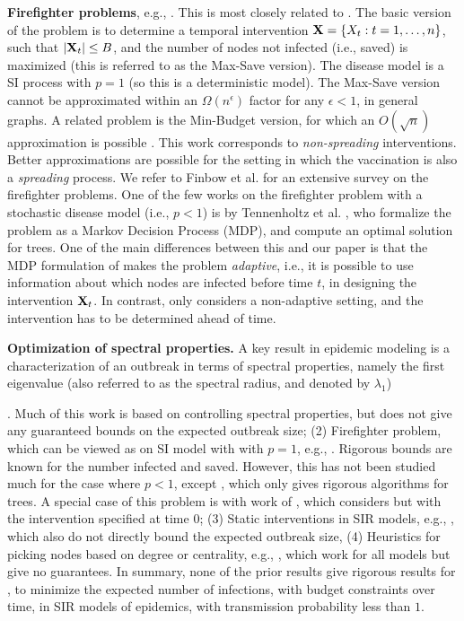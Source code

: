 \noindent
\textbf{Firefighter problems}, e.g., \cite{anshelevich09,Finbow2009TheFP,Chalermsook:2010:RMF:1873601.1873709}. 
This is most closely related to \prob{}. The basic version of the problem is to
determine a temporal intervention $\mathbf{X}=\{X_t: t=1,\ldots,n\}$, such that $|\mathbf{X}_t|\leq B$,
and the number of nodes not infected (i.e., saved) is maximized (this is referred to as the Max-Save version).
The disease model is a SI process with $p=1$ (so this is a deterministic model).
The Max-Save version cannot be approximated within an $\Omega(n^{\epsilon})$ factor for any $\epsilon < 1$, in general graphs.
A related problem is the Min-Budget version, for which an $O(\sqrt{n})$ approximation is 
possible \cite{Chalermsook:2010:RMF:1873601.1873709}.
This work corresponds to \emph{non-spreading} interventions. Better approximations are possible for the setting in which
the vaccination is also a \emph{spreading} process.
We refer to Finbow et al. \cite{Finbow2009TheFP} for an extensive survey on the firefighter problems.
One of the few works on the firefighter problem with a stochastic disease model (i.e., $p<1$) is by
Tennenholtz et al. \cite{DBLP:journals/corr/abs-1711-08237}, who formalize the problem as a Markov Decision Process (MDP),
and compute an optimal solution for trees.  One of the main differences between this and our paper is that
the MDP formulation of \cite{DBLP:journals/corr/abs-1711-08237} makes the problem \emph{adaptive},
i.e., it is possible to use information about which nodes are infected before time $t$, in designing 
the intervention $\mathbf{X}_t$. In contrast, \prob{} only considers a non-adaptive setting, and the intervention
has to be determined ahead of time.

\noindent
\textbf{Optimization of spectral properties.}
A key result in epidemic modeling is a characterization of an outbreak in terms of spectral properties,
namely the first eigenvalue (also referred to as the spectral radius, and denoted by $\lambda_1$)

\cite{PreciadoVM13_2,PreciadoVM13,PreciadoVM14,SahaSDM15,Ogura2017}. Much of this work is based on
controlling spectral properties, but does not give any guaranteed bounds on the expected outbreak size;
(2) Firefighter problem, which can be viewed as \prob{} on SI model with with $p=1$, e.g.,
\cite{anshelevich09,Finbow2009TheFP}. Rigorous bounds are known for the number infected and saved.
However, this has not been studied much for the case where $p<1$, except \cite{DBLP:journals/corr/abs-1711-08237},
which only gives rigorous algorithms for trees.
A special case of this problem is with work of \cite{Aspnes:2005}, which considers \prob{} but with
the intervention specified at time 0;
(3) Static interventions in SIR models, e.g., \cite{zhang2015controlling,YaoSDM2014}, which also do not
directly bound the expected outbreak size,
(4) Heuristics for picking nodes based on degree or centrality, e.g., \cite{PhysRevLett.91.247901,Miller2007EffectiveVS},
which work for all models but give no guarantees.
In summary, none of the prior results give rigorous results for \prob{}, to minimize the expected
number of infections, with budget constraints over time, in SIR models of epidemics, with transmission probability less than $1$.



